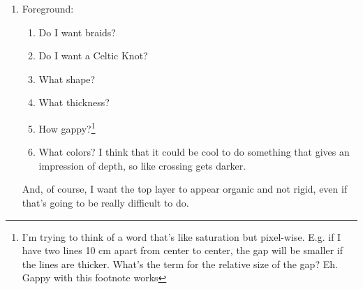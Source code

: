 \documentclass[12pt]{article}
\newcommand{\say}[1]{``#1''}
\renewcommand{\,}{\textsuperscript{,}}
\begin{document}
\begin{enumerate}
\begin{enumerate}
\begin{enumerate}
\item What color or colors are the weave strands?\footnote{look at that, managed to write the sentence so I didn't need an is/are}

\item Is the weave going to be a Celtic knot? If so, what is the design for it?

\item Do we incorporate the base gradient colors in the weave strands, and if so, how much?\footnote{initially this said \say{do we need to} but I realize that this project is not needed in any sense, and so there is no version wherein it is necessary to have it}

\end{enumerate}

Of course, all of these questions are fairly inter-reliant.  
A thicker strand will result in a higher strand density, and a larger total stitch-count project will likely mean that I need to have a thicker strand for visibility.  
Then again, there's also something really compelling to me in the idea that the strands might be almost invisible when looking at the embroidery from afar.  
Who can say for certain?

\item Foreground:

\begin{enumerate}

\item Do I want braids?

\item Do I want a Celtic Knot?

\item What shape?

\item What thickness?

\item How gappy?\footnote{I'm trying to think of a word that's like saturation but pixel-wise. E.g. if I have two lines 10 cm apart from center to center, the gap will be smaller if the lines are thicker. What's the term for the relative size of the gap? Eh. Gappy with this footnote works}

\item What colors? I think that it could be cool to do something that gives an impression of depth, so like crossing gets darker.

\end{enumerate}

And, of course, I want the top layer to appear organic and not rigid, even if that's going to be really difficult to do.

\end{enumerate}

\end{enumerate}
\end{document}
